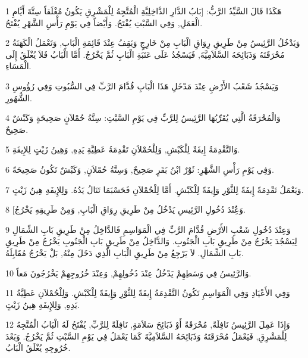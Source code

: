 \par 1 هَكَذَا قَالَ السَّيِّدُ الرَّبُّ: [بَابُ الدَّارِ الدَّاخِلِيَّةِ الْمُتَّجِهُ لِلْمَشْرِقِ يَكُونُ مُغْلَقاً سِتَّةَ أَيَّامِ الْعَمَلِ, وَفِي السَّبْتِ يُفْتَحُ. وَأَيْضاً فِي يَوْمِ رَأْسِ الشَّهْرِ يُفْتَحُ.
\par 2 وَيَدْخُلُ الرَّئِيسُ مِنْ طَرِيقِ رِوَاقِ الْبَابِ مِنْ خَارِجٍ وَيَقِفُ عِنْدَ قَائِمَةِ الْبَابِ, وَتَعْمَلُ الْكَهَنَةُ مُحْرَقَتَهُ وَذَبَائِحَهُ السَّلاَمِيَّةَ, فَيَسْجُدُ عَلَى عَتَبَةِ الْبَابِ ثُمَّ يَخْرُجُ. أَمَّا الْبَابُ فَلاَ يُغْلَقُ إِلَى الْمَسَاءِ.
\par 3 وَيَسْجُدُ شَعْبُ الأَرْضِ عِنْدَ مَدْخَلِ هَذَا الْبَابِ قُدَّامَ الرَّبِّ فِي السُّبُوتِ وَفِي رُؤُوسِ الشُّهُورِ.
\par 4 وَالْمُحْرَقَةُ الَّتِي يُقَرِّبُهَا الرَّئِيسُ لِلرَّبِّ فِي يَوْمِ السَّبْتِ: سِتَّةُ حُمْلاَنٍ صَحِيحَةٍ وَكَبْشٌ صَحِيحٌ.
\par 5 وَالتَّقْدِمَةُ إِيفَةٌ لِلْكَبْشِ, وَلِلْحُمْلاَنِ تَقْدِمَةُ عَطِيَّةِ يَدِهِ, وَهِينُ زَيْتٍ لِلإِيفَةِ.
\par 6 وَفِي يَوْمِ رَأْسِ الشَّهْرِ: ثَوْرٌ ابْنُ بَقَرٍ صَحِيحٌ, وَسِتَّةُ حُمْلاَنٍ, وَكَبْشٌ تَكُونُ صَحِيحَةً.
\par 7 وَيَعْمَلُ تَقْدِمَةً إِيفَةً لِلثَّوْرِ وَإِيفَةً لِلْكَبْشِ. أَمَّا لِلْحُمْلاَنِ فَحَسْبَمَا تَنَالُ يَدُهُ. وَلِلإِيفَةِ هِينُ زَيْتٍ.
\par 8 [وَعَُِنْدَ دُخُولِ الرَّئِيسِ يَدْخُلُ مِنْ طَرِيقِ رِوَاقِ الْبَابِ, وَمِنْ طَرِيقِهِ يَخْرُجُ.
\par 9 وَعِنْدَ دُخُولِ شَعْبِ الأَرْضِ قُدَّامَ الرَّبِّ فِي الْمَوَاسِمِ فَالدَّاخِلُ مِنْ طَرِيقِ بَابِ الشِّمَالِ لِيَسْجُدَ يَخْرُجُ مِنْ طَرِيقِ بَابِ الْجَنُوبِ. وَالدَّاخِلُ مِنْ طَرِيقِ بَابِ الْجَنُوبِ يَخْرُجُ مِنْ طَرِيقِ بَابِ الشِّمَالِ. لاَ يَرْجِعُ مِنْ طَرِيقِ الْبَابِ الَّذِي دَخَلَ مِنْهُ, بَلْ يَخْرُجُ مُقَابِلَهُ.
\par 10 وَالرَّئِيسُ فِي وَسَطِهِمْ يَدْخُلُ عِنْدَ دُخُولِهِمْ, وَعِنْدَ خُرُوجِهِمْ يَخْرُجُونَ مَعاً.
\par 11 وَفِي الأَعْيَادِ وَفِي الْمَوَاسِمِ تَكُونُ التَّقْدِمَةُ إِيفَةً لِلثَّوْرِ وَإِيفَةً لِلْكَبْشِ. وَلِلْحُمْلاَنِ عَطِيَّةُ يَدِهِ, وَلِلإِيفَةِ هِينُ زَيْتٍ.
\par 12 وَإِذَا عَمِلَ الرَّئِيسُ نَافِلَةً, مُحْرَقَةً أَوْ ذَبَائِحَ سَلاَمَةٍ, نَافِلَةً لِلرَّبِّ, يُفْتَحُ لَهُ الْبَابُ الْمُتَّجِهُ لِلْمَشْرِقِ, فَيَعْمَلُ مُحْرَقَتَهُ وَذَبَائِحَهُ السَّلاَمِيَّةَ كَمَا يَعْمَلُ فِي يَوْمِ السَّبْتِ ثُمَّ يَخْرُجُ. وَبَعْدَ خُرُوجِهِ يُغْلَقُ الْبَابُ.
